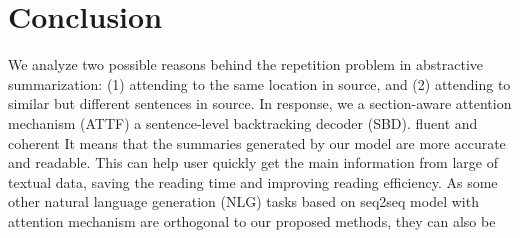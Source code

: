 \section{Conclusion}
\label{sec:conclude}
We analyze two possible reasons behind the repetition problem in abstractive
summarization: (1) attending to the same location in source,
and (2) attending to similar but different sentences in source. 
In response, 
we \DIFdelbegin {}\DIFdelend \DIFaddbegin {}\DIFaddend a section-aware attention mechanism (ATTF)
\DIFdelbegin {}\DIFdelend \DIFaddbegin {}\DIFaddend a sentence-level backtracking decoder (SBD). 
\DIFdelbegin {}\DIFdelend \DIFaddbegin {}\DIFaddend fluent and coherent\DIFdelbegin {}\DIFdelend \DIFaddbegin {}\DIFaddend %
It means that the summaries generated by our model are more accurate and 
readable. This can help user quickly get the main information from large of textual data,
saving the reading time and improving reading efficiency.
As some other natural language generation (NLG) tasks based on seq2seq model with attention mechanism
are orthogonal to our proposed methods,
they can also be \DIFdelbegin {}\DIFdelend \DIFaddbegin {}\DIFaddend %

